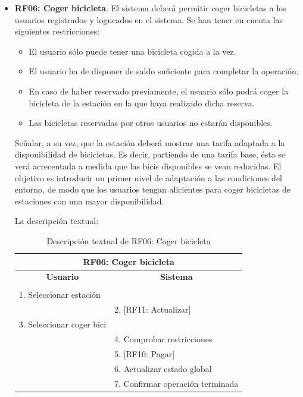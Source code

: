 \begin{itemize}
	\FloatBarrier
	\item \textbf{RF06: Coger bicicleta}. El sistema deberá permitir coger bicicletas a los usuarios registrados y logueados en el sistema. Se han tener en cuenta las siguientes restricciones:
	\begin{itemize}
		\item El usuario sólo puede tener una bicicleta cogida a la vez.
		\item El usuario ha de disponer de saldo suficiente para completar la operación.
		\item En caso de haber reservado previamente, el usuario sólo podrá coger la bicicleta de la estación en la que haya realizado dicha reserva.
		\item Las bicicletas reservadas por otros usuarios no estarán disponibles.
	\end{itemize}
	Señalar, a su vez, que la estación deberá mostrar una tarifa adaptada a la disponibilidad de bicicletas. Es decir, partiendo de una tarifa base, ésta se verá acrecentada a medida que las bicis disponibles se vean reducidas. El objetivo es introducir un primer nivel de adaptación a las condiciones del entorno, de modo que los usuarios tengan alicientes para coger bicicletas de estaciones con una mayor disponibilidad. 
	
	La descripción textual:
	\begin{table}[h]
		\centering	
		\begin{tabular}{|l|l|}
			\hline
			\multicolumn{2}{|c|}{\textbf{RF06: Coger bicicleta}} \\ \hline
			\multicolumn{1}{|c|}{\textbf{Usuario}} & \multicolumn{1}{c|}{\textbf{Sistema}} \\ \hline
			[Pto. inclusión: RF02: Loguear usuario] &\\ \hline
			1. Seleccionar estación &\\ \hline
			& 2. [RF11: Actualizar] \\ \hline
			3. Seleccionar coger bici &\\ \hline
			& 4. Comprobar restricciones \\ \hline
			& 5. [RF10: Pagar] \\ \hline
			& 6. Actualizar estado global \\ \hline
			& 7. Confirmar operación terminada \\ \hline 	
		\end{tabular}
		\caption{Descripción textual de RF06: Coger bicicleta}
		\label{tab:tablaDescTextualRF06}
	\end{table}
	

\end{itemize}
